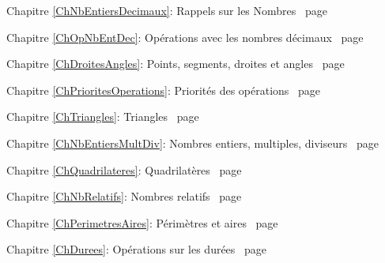 \documentclass[TS]{sesamanuel}
\begin{document}
\begin{commentaire}


\textcolor{PartieFonction}{\PrerequisTitleFont 
Chapitre \ref{ChNbEntiersDecimaux}: Rappels sur les Nombres \dotfill\ page\pageref{ChNbEntiersDecimaux}}

\vspace{2em}

\textcolor{PartieFonction}{\PrerequisTitleFont 
Chapitre \ref{ChOpNbEntDec}: Opérations avec les nombres décimaux \dotfill\ page \pageref{ChOpNbEntDec}}

\vspace{2em}

\textcolor{PartieGeometrie}{\PrerequisTitleFont 
Chapitre \ref{ChDroitesAngles}: Points, segments, droites et angles \dotfill\ page \pageref{ChDroitesAngles}}

\vspace{2em}

\textcolor{PartieFonction}{\PrerequisTitleFont 
Chapitre \ref{ChPrioritesOperations}: Priorités des opérations \dotfill\ page \pageref{ChPrioritesOperations}}

\vspace{2em}

\textcolor{PartieGeometrie}{\PrerequisTitleFont 
Chapitre \ref{ChTriangles}: Triangles \dotfill\ page \pageref{ChTriangles}}

\vspace{2em}

\textcolor{PartieFonction}{\PrerequisTitleFont 
Chapitre \ref{ChNbEntiersMultDiv}: Nombres entiers, multiples, diviseurs \dotfill\ page \pageref{ChNbEntiersMultDiv}}

\vspace{2em}

\textcolor{PartieGeometrie}{\PrerequisTitleFont 
Chapitre \ref{ChQuadrilateres}: Quadrilatères \dotfill\ page \pageref{ChQuadrilateres}}

\vspace{2em}

\textcolor{PartieFonction}{\PrerequisTitleFont 
Chapitre \ref{ChNbRelatifs}: Nombres relatifs \dotfill\ page \pageref{ChNbRelatifs}}

\vspace{2em}

\textcolor{PartieGeometrie}{\PrerequisTitleFont 
Chapitre \ref{ChPerimetresAires}: Périmètres et aires \dotfill\ page \pageref{ChPerimetresAires}}

\vspace{2em}
\textcolor{PartieFonction}{\PrerequisTitleFont 
Chapitre \ref{ChDurees}: Opérations sur les durées \dotfill\ page\pageref{ChDurees}}

\end{commentaire}
\end{document}
